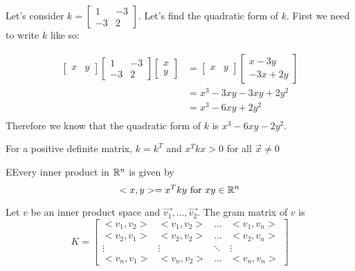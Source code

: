 	\begin{problem}
		Let's consider $k=\begin{bmatrix} 1&-3\\-3&2 \end{bmatrix}$. Let's find the quadratic form of $k$. First we need to write $k$ like so:

		\begin{align}
			\begin{bmatrix} x&y \end{bmatrix} \begin{bmatrix} 1&-3\\-3&2 \end{bmatrix} \begin{bmatrix} x\\y \end{bmatrix} &=\begin{bmatrix} x&y \end{bmatrix} \begin{bmatrix} x-3y\\-3x+2y \end{bmatrix} \\
					 &=x^3-3xy-3xy+2y^2\\
					 &=x^3-6xy+2y^2\\
		\end{align}
		 Therefore we know that the quadratic form of $k$ is $x^3-6xy-2y^2$.
	\end{problem}

  For a positive definite matrix, $k=k^{T}$ and $x^{T}kx>0$ for all $\vec{x}\neq 0$

  \begin{theorem}
    EEvery inner product in $\mathbb{R}^n$ is given by 
    \begin{equation}
      <x,y> = x^{T}ky \text{ for }xy\in\mathbb{R}^n
    \end{equation}

    Let $v$ be an inner product space and $\vec{v_1},\ldots,\vec{v_2}$. The gram matrix of $v$ is 
    \begin{equation}
      K=
      \begin{bmatrix} 
        <v_1,v_2>&<v_1,v_2>&\ldots&<v_1,v_n>\\
        <v_2,v_1>&<v_2,v_2>&\ldots&<v_2,v_n>\\
        \vdots&\vdots&\ddots&\vdots\\
        <v_n,v_1>&<v_n,v_2>&\ldots&<v_n,v_n>
      \end{bmatrix} 
    \end{equation}
  \end{theorem}

